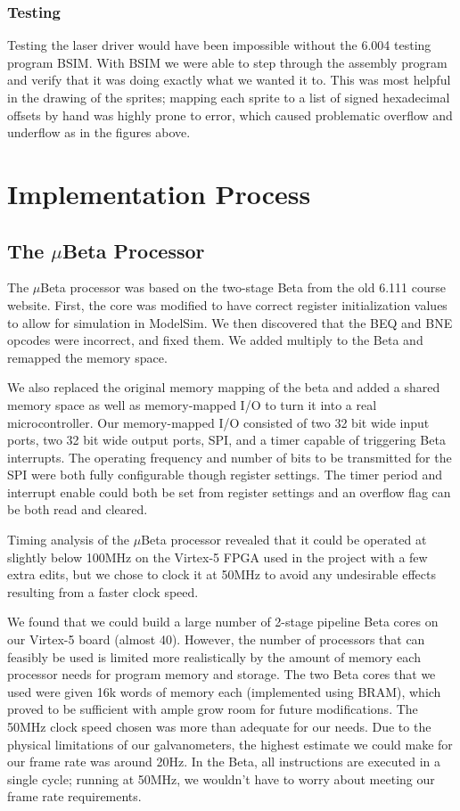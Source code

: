 \documentclass{article}
\begin{document}
\subsubsection{Testing}

Testing the laser driver would have been impossible without the 6.004 testing program BSIM. With BSIM we were able to step through the assembly program and verify that it was doing exactly what we wanted it to. This was most helpful in the drawing of the sprites; mapping each sprite to a list of signed hexadecimal offsets by hand was highly prone to error, which caused problematic overflow and underflow as in the figures above. 

\section{Implementation Process} \label{implementation}
\subsection{The $\mu$Beta Processor} \label{mbeta}
The $\mu$Beta processor was based on the two-stage Beta from the old 6.111 course website.  First, the core was modified to have correct register initialization values to allow for simulation in ModelSim. We then discovered that the BEQ and BNE opcodes were incorrect, and fixed them. We added multiply to the Beta and remapped the memory space. 

We also replaced the original memory mapping of the beta and added a shared memory space as well as memory-mapped I/O to turn it into a real microcontroller. Our memory-mapped I/O consisted of two 32 bit wide input ports, two 32 bit wide output ports, SPI, and a timer capable of triggering Beta interrupts. The operating frequency and number of bits to be transmitted for the SPI were both fully configurable though register settings. The timer period and interrupt enable could both be set from register settings and an overflow flag can be both read and cleared. 

Timing analysis of the $\mu$Beta processor revealed that it could be operated at slightly below 100MHz on the Virtex-5 FPGA used in the project with a few extra edits, but we chose to clock it at 50MHz to avoid any undesirable effects resulting from a faster clock speed. 

We found that we could build a large number of 2-stage pipeline \gls{Beta} cores on our Virtex-5 board (almost 40). However, the number of processors that can feasibly be used is limited more realistically by the amount of memory each processor needs for program memory and storage. The two Beta cores that we used were given 16k words of memory each (implemented using BRAM), which proved to be sufficient with ample grow room for future modifications. The 50MHz clock speed chosen was more than adequate for our needs. Due to the physical limitations of our galvanometers, the highest estimate we could make for our frame rate was around 20Hz. In the Beta, all instructions are executed in a single cycle; running at 50MHz, we wouldn't have to worry about meeting our frame rate requirements.
\end{document}
